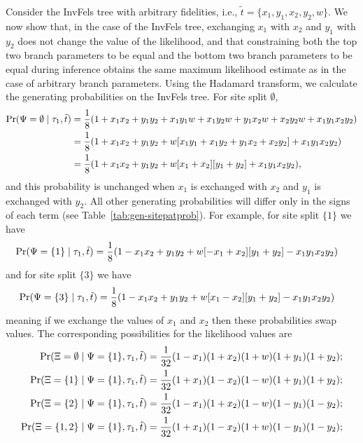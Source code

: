 Consider the InvFels tree with arbitrary fidelities, i.e., $\tilde{t}=\{x_1,y_1,x_2,y_2,w\}$.
We now show that, in the case of the InvFels tree, exchanging $x_1$ with $x_2$ and $y_1$ with $y_2$ does not change the value of the likelihood, and that constraining both the top two branch parameters to be equal and the bottom two branch parameters to be equal during inference obtains the same maximum likelihood estimate as in the case of arbitrary branch parameters.
Using the Hadamard transform, we calculate the generating probabilities on the InvFels tree.
For site split $\emptyset$,
\begin{align*}
    \Pr(\Psi=\emptyset\mid \tau_1, \tilde{t}) & = \frac{1}{8} (1 + x_1x_2 +  y_1y_2 +  x_1y_1w + x_1y_2w + y_1x_2w + x_2y_2w + x_1y_1x_2y_2) \\
                                              & = \frac{1}{8} (1 + x_1x_2 +  y_1y_2 +  w[x_1y_1 + x_1y_2 + y_1x_2 + x_2y_2] + x_1y_1x_2y_2) \\
                                              & = \frac{1}{8} (1 + x_1x_2 +  y_1y_2 +  w[x_1 + x_2][y_1 + y_2] + x_1y_1x_2y_2),
\end{align*}
and this probability is unchanged when $x_1$ is exchanged with $x_2$ and $y_1$ is exchanged with $y_2$.
All other generating probabilities will differ only in the signs of each term (see Table~\ref{tab:gen-sitepatprob}).
For example, for site split $\{1\}$ we have
\begin{align*}
    \Pr(\Psi=\{1\}\mid \tau_1, \tilde{t}) & = \frac{1}{8} (1 - x_1x_2 +  y_1y_2 +  w[-x_1 + x_2][y_1 + y_2] - x_1y_1x_2y_2)
\end{align*}
and for site split $\{3\}$ we have
\begin{align*}
    \Pr(\Psi=\{3\}\mid \tau_1, \tilde{t}) & = \frac{1}{8} (1 - x_1x_2 +  y_1y_2 +  w[x_1 - x_2][y_1 + y_2] - x_1y_1x_2y_2)
\end{align*}
meaning if we exchange the values of $x_1$ and $x_2$ then these probabilities swap values.
The corresponding possibilities for the likelihood values are
\begin{align*}
    \Pr(\Xi=\emptyset \mid \Psi=\{1\}, \tau_1, \tilde{t}) &= \frac{1}{32}(1-x_1)(1+x_2)(1+w)(1+y_1)(1+y_2); \\
    \Pr(\Xi=\{1\} \mid \Psi=\{1\}, \tau_1, \tilde{t}) &= \frac{1}{32}(1+x_1)(1-x_2)(1-w)(1+y_1)(1+y_2); \\
    \Pr(\Xi=\{2\} \mid \Psi=\{1\}, \tau_1, \tilde{t}) &= \frac{1}{32}(1-x_1)(1+x_2)(1-w)(1-y_1)(1-y_2); \\
    \Pr(\Xi=\{1,2\} \mid \Psi=\{1\}, \tau_1, \tilde{t}) &= \frac{1}{32}(1+x_1)(1-x_2)(1+w)(1-y_1)(1-y_2);
\end{align*}
